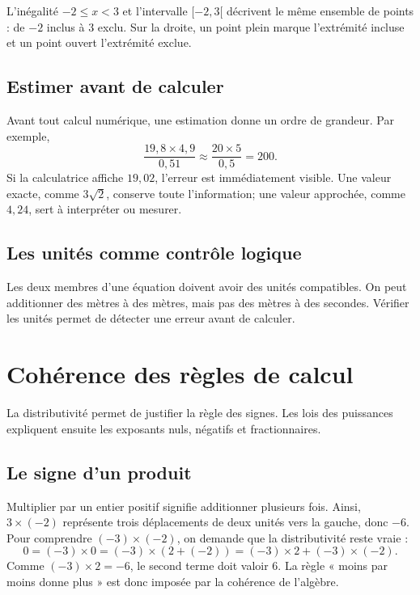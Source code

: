 \begin{connectionbox}
L'inégalité $-2\le x<3$ et l'intervalle $[-2,3[$ décrivent le même ensemble de points : de $-2$ inclus à $3$ exclu. Sur la droite, un point plein marque l'extrémité incluse et un point ouvert l'extrémité exclue.
\end{connectionbox}

\subsection{Estimer avant de calculer}
Avant tout calcul numérique, une estimation donne un ordre de grandeur. Par exemple,
\[
\frac{19{,}8\times 4{,}9}{0{,}51}\approx\frac{20\times5}{0{,}5}=200.
\]
Si la calculatrice affiche $19{,}02$, l'erreur est immédiatement visible. Une valeur exacte, comme $3\sqrt2$, conserve toute l'information; une valeur approchée, comme $4{,}24$, sert à interpréter ou mesurer.

\subsection{Les unités comme contrôle logique}
Les deux membres d'une équation doivent avoir des unités compatibles. On peut additionner des mètres à des mètres, mais pas des mètres à des secondes. Vérifier les unités permet de détecter une erreur avant de calculer.


\section{Cohérence des règles de calcul}
\label{manual:section:01.06}

La distributivité permet de justifier la règle des signes. Les lois des puissances expliquent ensuite les exposants nuls, négatifs et fractionnaires.

\subsection{Le signe d'un produit}
Multiplier par un entier positif signifie additionner plusieurs fois. Ainsi, $3\times(-2)$ représente trois déplacements de deux unités vers la gauche, donc $-6$. Pour comprendre $(-3)\times(-2)$, on demande que la distributivité reste vraie :
\[
0=(-3)\times0=(-3)\times(2+(-2))=(-3)\times2+(-3)\times(-2).
\]
Comme $(-3)\times2=-6$, le second terme doit valoir $6$. La règle « moins par moins donne plus » est donc imposée par la cohérence de l'algèbre.

